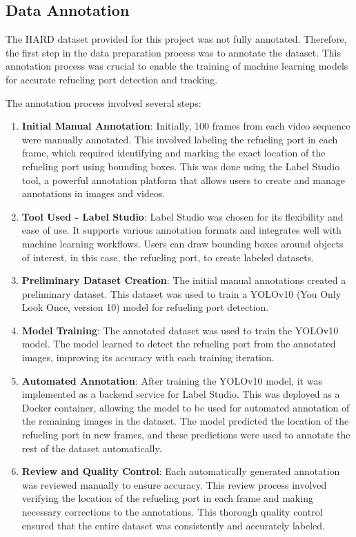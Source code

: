 \documentclass[12pt,oneside]{book} %
\begin{document}
\subsection{Data Annotation}
The HARD dataset provided for this project was not fully annotated. Therefore,
the first step in the data preparation process was to annotate the dataset.
This annotation process was crucial to enable the training of machine learning
models for accurate refueling port detection and tracking.

The annotation process involved several steps:
\begin{enumerate}
    \item \textbf{Initial Manual Annotation}: Initially, 100 frames from each video sequence were manually annotated. This involved labeling the refueling port in each frame, which required identifying and marking the exact location of the refueling port using bounding boxes. This was done using the Label Studio tool, a powerful annotation platform that allows users to create and manage annotations in images and videos.
    \item \textbf{Tool Used - Label Studio}: Label Studio was chosen for its flexibility and ease of use. It supports various annotation formats and integrates well with machine learning workflows. Users can draw bounding boxes around objects of interest, in this case, the refueling port, to create labeled datasets.
    \item \textbf{Preliminary Dataset Creation}: The initial manual annotations created a preliminary dataset. This dataset was used to train a YOLOv10 (You Only Look Once, version 10) model for refueling port detection.
    \item \textbf{Model Training}: The annotated dataset was used to train the YOLOv10 model. The model learned to detect the refueling port from the annotated images, improving its accuracy with each training iteration.
    \item \textbf{Automated Annotation}: After training the YOLOv10 model, it was implemented as a backend service for Label Studio. This was deployed as a Docker container, allowing the model to be used for automated annotation of the remaining images in the dataset. The model predicted the location of the refueling port in new frames, and these predictions were used to annotate the rest of the dataset automatically.
    \item \textbf{Review and Quality Control}: Each automatically generated annotation was reviewed manually to ensure accuracy. This review process involved verifying the location of the refueling port in each frame and making necessary corrections to the annotations. This thorough quality control ensured that the entire dataset was consistently and accurately labeled.
\end{enumerate}
\end{document}
